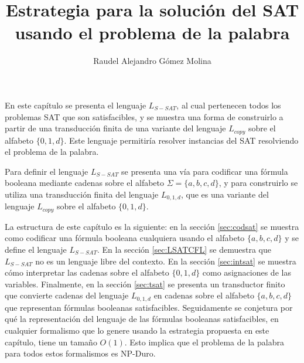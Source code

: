 \documentclass[12pt]{article}
\title{Estrategia para la solución del SAT usando el problema de la palabra}
\author{Raudel Alejandro Gómez Molina}
\begin{document}
\maketitle





En este capítulo se presenta el lenguaje $L_{S-SAT}$, al cual pertenecen todos los problemas SAT que son 
satisfacibles, y se muestra una forma de construirlo a partir de una transducción finita de una variante 
del lenguaje $L_{copy}$ sobre el alfabeto $\{0,1,d\}$. Este lenguaje permitiría resolver instancias del SAT resolviendo el problema de la palabra.  

Para definir el lenguaje $L_{S-SAT}$ se presenta una vía para codificar una fórmula booleana mediante cadenas sobre el alfabeto $\Sigma=\{a, b,c,d\}$, y para construirlo se utiliza una transducción finita del lenguaje $L_{0,1,d}$, que es una variante del lenguaje $L_{copy}$ sobre el alfabeto $\{0,1,d\}$.

La estructura de este capítulo es la siguiente: en la sección \ref{sec:codsat} se muestra como codificar una fórmula booleana cualquiera usando el alfabeto $\{a,b,c,d\}$ y se define el lenguaje $L_{S-SAT}$.  En la sección \ref{sec:LSATCFL} se demuestra que $L_{S-SAT}$ no es un lenguaje libre del contexto.  En la sección \ref{sec:intsat} se muestra cómo interpretar las cadenas sobre el alfabeto $\{0,1,d\}$ como asignaciones de las variables. Finalmente, en la sección \ref{sec:tsat} se presenta un transductor finito que convierte cadenas del lenguaje $L_{0,1,d}$ en cadenas sobre el alfabeto $\{a,b,c,d\}$ que representan fórmulas booleanas satisfacibles. Seguidamente se conjetura por qué la representación del lenguaje de las fórmulas booleanas satisfacibles, en cualquier formalismo que lo genere usando la estrategia propuesta en este capítulo, tiene un tamaño $O(1)$. Esto implica que el problema de la palabra para todos estos formalismos es NP-Duro.
\end{document}
